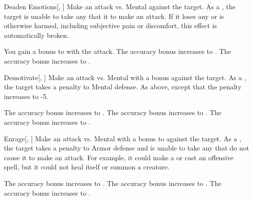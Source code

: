 \lowercase{\hypertarget{spell:Deaden Emotions}{}}\label{spell:Deaden Emotions}
\begin{freeability}[Rank 2]{\hypertarget{spell:Deaden Emotions}{Deaden Emotions}}[, ]
Make an attack vs. Mental against the target.
\hit As a , the target is unable to take any  that it to make an attack.
If it loses any  or is otherwise harmed, including subjective pain or discomfort, this effect is automatically broken.

\rankline
{} You gain a  bonus to  with the attack.
 The accuracy bonus increases to .
 The accuracy bonus increases to .

\end{freeability}
\vspace{0.25em}



\lowercase{\hypertarget{spell:Demotivate}{}}\label{spell:Demotivate}
\begin{freeability}[Rank 2]{\hypertarget{spell:Demotivate}{Demotivate}}[, ]
Make an attack vs. Mental with a  bonus against the target.
\hit As a , the target takes a  penalty to Mental defense.
\crit As above, except that the penalty increases to -5.

\rankline
{} The accuracy bonus increases to .
 The accuracy bonus increases to .
 The accuracy bonus increases to .

\end{freeability}
\vspace{0.25em}



\lowercase{\hypertarget{spell:Enrage}{}}\label{spell:Enrage}
\begin{freeability}[Rank 2]{\hypertarget{spell:Enrage}{Enrage}}[, ]
Make an attack vs. Mental with a  bonus to  against the target.
\hit As a , the target takes a  penalty to Armor defense and is unable to take any  that do not cause it to make an attack.
For example, it could make a  or cast an offensive spell, but it could not heal itself or summon a creature.

\rankline
{} The accuracy bonus increases to .
 The accuracy bonus increases to .
 The accuracy bonus increases to .

\end{freeability}
\vspace{0.25em}



